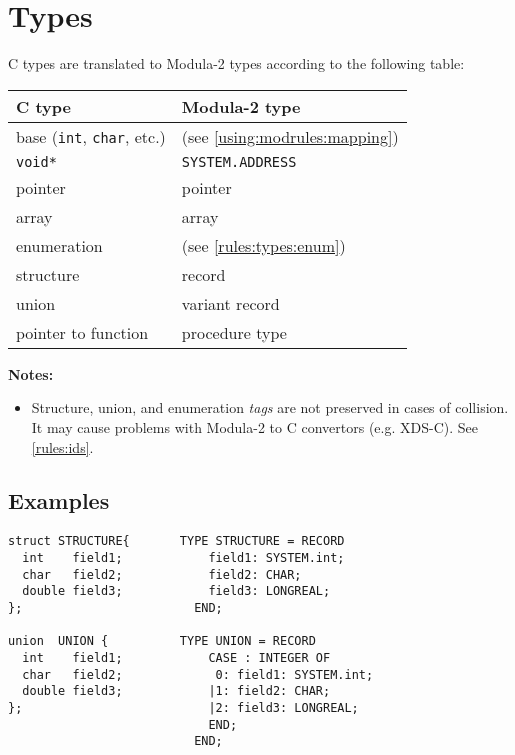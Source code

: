 \section{Types}
\label{rules:types}

C types are translated to Modula-2 types according to the following table:

\begin{center}
\begin{tabular}{ll}
\bf C type          & \bf Modula-2 type \\
\hline
base ({\tt int}, {\tt char}, etc.)  & (see \ref{using:modrules:mapping}) \\
\tt void*           & \tt SYSTEM.ADDRESS \\
pointer             & pointer        \\
array               & array          \\
enumeration         & (see \ref{rules:types:enum}) \\
structure           & record         \\
union               & variant record \\
pointer to function & procedure type
\end{tabular}
\end{center}

{\bf Notes:}

\begin{itemize}
\item Structure, union, and enumeration {\em tags} are not preserved in cases of
      collision. It may cause problems with Modula-2 to C convertors (e.g. XDS-C).
      See \ref{rules:ids}.
\end{itemize}

\subsection*{Examples}
{\samepage
{\ifonline\else\small\fi

\begin{verbatim}
struct STRUCTURE{       TYPE STRUCTURE = RECORD
  int    field1;            field1: SYSTEM.int;
  char   field2;            field2: CHAR;
  double field3;            field3: LONGREAL;
};                        END;

union  UNION {          TYPE UNION = RECORD
  int    field1;            CASE : INTEGER OF
  char   field2;             0: field1: SYSTEM.int;
  double field3;            |1: field2: CHAR;
};                          |2: field3: LONGREAL;
                            END;
                          END;

\end{verbatim}
} %
} %

